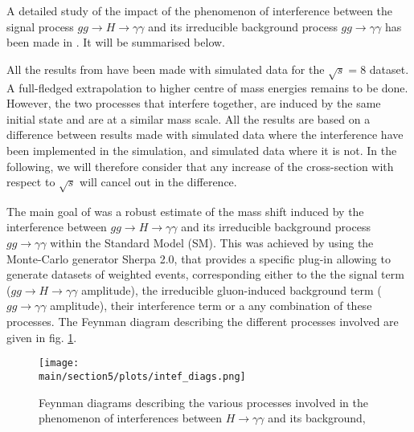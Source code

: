 A detailed study of the impact of the phenomenon of interference between the signal process $gg \rightarrow H \rightarrow \gamma\gamma$ and its irreducible background process $gg \rightarrow \gamma\gamma$ has been made in \cite{ATL-PHYS-PUB-2016-009}. It will be summarised below.

All the results from \cite{ATL-PHYS-PUB-2016-009} have been made with simulated data for the $\sqrt{s} = 8$ \UTeV dataset. A full-fledged extrapolation to higher centre of mass energies remains to be done. However, the two processes that interfere together, are induced by the same initial state and are at a similar mass scale. All the results are based on a difference between results made with simulated data where the interference have been implemented in the simulation, and simulated data where it is not. In the following, we will therefore consider that any increase of the cross-section with respect to $\sqrt{s}$ will cancel out in the difference.

The main goal of \cite{ATL-PHYS-PUB-2016-009} was a robust estimate of the mass shift induced by the interference between $gg \rightarrow H \rightarrow \gamma\gamma$ and its irreducible background process $gg \rightarrow \gamma\gamma$ within the Standard Model (SM). This was achieved by using the Monte-Carlo generator Sherpa 2.0, that provides a specific plug-in allowing to generate datasets of weighted events, corresponding either to the the signal term ($gg \rightarrow H \rightarrow \gamma\gamma$ amplitude), the irreducible gluon-induced background term ($gg \rightarrow \gamma\gamma$ amplitude), their interference term or a any combination of these processes. The Feynman diagram describing the different processes involved are given in fig. \ref{fig:intef_diags}. 

\begin{figure}
    \centering
    \texttt{[image: \\main/section5/plots/intef\_diags.png]}
    \caption{Feynman diagrams describing the various processes involved in the phenomenon of interferences between $H\rightarrow\gamma\gamma$ and its background,}
    \label{fig:intef_diags}
\end{figure}

